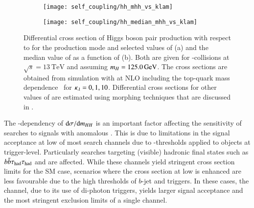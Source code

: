 \begin{figure}[htbp]
  \begin{subfigure}[t]{0.485\textwidth}
    \texttt{[image: self\_coupling/hh\_mhh\_vs\_klam]}
    \subcaption{%
    }%
    \label{fig:hh_xsec_mhh}
  \end{subfigure}\hfill%
  \begin{subfigure}[t]{0.485\textwidth}
    \texttt{[image: self\_coupling/hh\_median\_mhh\_vs\_klam]}
    \subcaption{%
    }%
    \label{fig:hh_median_mhh}
  \end{subfigure}

  \caption{Differential cross section of Higgs boson pair production
    with respect to \mHH for the \ggF production mode and selected
    values of \klambda (a) and the median value of \mHH as a function
    of \klambda (b). Both are given for \pp-collisions at
    $\sqrt{s} = \SI{13}{\TeV}$ and assuming $m_{H} =
    \SI{125.0}{\ensuremath{\text{GeV}}}$. The cross sections are obtained from simulation
    with \POWHEGBOX[v2] at NLO including the top-quark mass
    dependence~\cite{Heinrich:2019bkc,Heinrich:2020ckp} for
    $\kappa_{\lambda} = 0, 1, 10$. Differential cross sections for other
    values of \klambda are estimated using morphing techniques that
    are discussed in .}
\end{figure}

The \klambda-dependency of $\mathrm{d}\sigma / \mathrm{d}m_{HH}$ is an
important factor affecting the sensitivity of searches to signals with
anomalous \klambda. This is due to limitations in the signal
acceptance at low \mHH of most search channels due to \pT-thresholds
applied to objects at trigger-level. Particularly searches targeting
(visible) hadronic final states such as $b\bar{b}\tau_{\text{had}}\tau_{\text{had}}$ and \bbbb are
affected. While these channels yield stringent cross section limits
for the SM case, scenarios where the cross section at low \mHH is
enhanced are less favourable due to the high thresholds of $b$-jet and
\tauhadvis triggers. In these cases, the \bbyy channel, due to its use
of di-photon triggers, yields larger signal acceptance and the most
stringent exclusion limits of a single channel.


